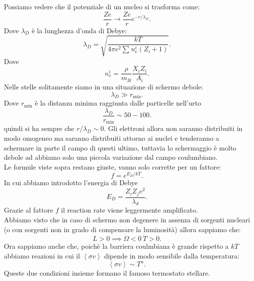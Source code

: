 Possiamo vedere che il potenziale di un nucleo si trasforma come:
\[
\frac{Ze}{r} \to \frac{Ze}{r} e^{-r /\lambda_D}
.\] 
Dove $\lambda_D$  è la lunghezza d'onda di Debye:
\[
    \lambda_D = \sqrt{\frac{kT}{4\pi e^2 \sum_{}^{} n_e^i\left(Z_i+1\right)}} 
.\] 
Dove 
\[
n_e^i = \frac{\rho}{m_H}\frac{X_iZ_i}{A_i}
.\] 
Nelle stelle solitamente siamo in una situazione di schermo debole: 
\[
\lambda_D\gg r_\text{min} 
.\] 
Dove $r_\text{min}$ è la distanza minima raggiunta dalle particelle nell'urto
\[
\frac{\lambda_D}{r_\text{min}} \sim  50-100
.\] 
quindi si ha sempre che $r /\lambda_D \sim 0$. Gli elettroni allora non saranno distribuiti in modo omogeneo ma saranno distribuiti attorno ai nuclei e tenderanno a schermare in parte il campo di questi ultimo, tuttavia lo schermaggio è molto debole ad abbiamo solo una piccola variazione dal campo coulumbiano. \\
Le formule viste sopra restano giuste, vanno solo corrette per un fattore:
\[
f = e^{E_D /kT}
.\] 
In cui abbiamo introdotto l'energia di Debye
\[
E_D = \frac{Z_iZ_j e^2}{\lambda_d}
.\] 
Grazie al fattore $f$ il reaction rate viene leggermente amplificato.\\
Abbiamo visto che in caso di schermo non degenere in assenza di sorgenti nucleari (o con sorgenti non in grado di compensare la luminosità) allora sappiamo che:
\[
    L>0 \implies \dot{\Omega}<0 \ \dot{T} > 0
.\] 
Ora sappiamo anche che, poichè la barriera coulmbiana è grande rispetto a $kT$ abbiamo reazioni in cui il $\left<\sigma v\right>$  dipende in modo sensibile dalla temperatura:
\[
\left<\sigma v\right>\sim T^n
.\] 
Queste due condizioni insieme formano il famoso termostato stellare.
